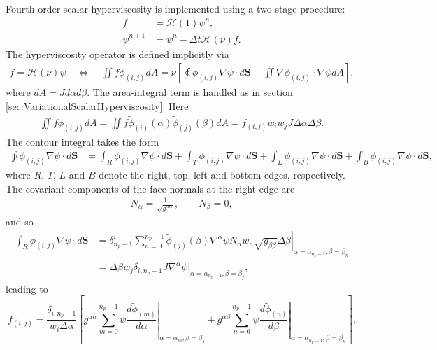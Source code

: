 \documentclass{article}
\newcommand{\vb}{\mathbf}
\newcommand{\diff}[2]{\frac{d #1}{d #2}}
\begin{document}
Fourth-order scalar hyperviscosity is implemented using a two stage procedure:
\begin{align}
f &= \mathcal{H}(1) \psi^n, \\
\psi^{n+1} &= \psi^n - \Delta t \mathcal{H}(\nu) f.
\end{align}  The hyperviscosity operator is defined implicitly via
\begin{align}
f = \mathcal{H}(\nu) \psi \quad \Longleftrightarrow \quad \iint f \phi_{(i,j)} dA = \nu \left[ \oint \phi_{(i,j)} \nabla \psi \cdot d\vb{S} - \iint \nabla \phi_{(i,j)} \cdot \nabla \psi dA \right],
\end{align} where $dA = J d\alpha d\beta$.  The area-integral term is handled as in section \ref{sec:VariationalScalarHyperviscosity}.  Here
\begin{align}
\iint f \phi_{(i,j)} dA = \iint f \tilde{\phi}_{(i)}(\alpha) \tilde{\phi}_{(j)}(\beta) dA = f_{(i,j)} w_i w_j J \Delta \alpha \Delta \beta.
\end{align}  The contour integral takes the form
\begin{align}
\oint \phi_{(i,j)} \nabla \psi \cdot d\vb{S} &= \int_R \phi_{(i,j)} \nabla \psi \cdot d\vb{S} + \int_T \phi_{(i,j)} \nabla \psi \cdot d\vb{S} + \int_L \phi_{(i,j)} \nabla \psi \cdot d\vb{S} + \int_B \phi_{(i,j)} \nabla \psi \cdot d\vb{S},
\end{align} where $R$, $T$, $L$ and $B$ denote the right, top, left and bottom edges, respectively.  The covariant components of the face normals at the right edge are
\begin{align}
N_\alpha = \frac{1}{\sqrt{g^{\alpha \alpha}}}, \qquad N_\beta = 0,
\end{align} and so
\begin{align}
\int_R \phi_{(i,j)} \nabla \psi \cdot d\vb{S} &= \delta^i_{n_p-1} \sum_{n=0}^{n_p-1} \left. \tilde{\phi}_{(j)}(\beta) \nabla^\alpha \psi N_\alpha w_n \sqrt{g_{\beta \beta}} \Delta \beta \right\vert_{\alpha = \alpha_{n_p-1}, \beta = \beta_n} \\
&= \Delta \beta w_j \delta_{i,n_p-1} \left. J \nabla^\alpha \psi \right\vert_{\alpha = \alpha_{n_p-1}, \beta = \beta_j},
\end{align} leading to
\begin{equation}
f_{(i,j)} = \frac{\delta_{i,n_p-1}}{w_i \Delta \alpha} \left[ g^{\alpha \alpha} \sum_{m=0}^{n_p-1} \psi \left. \diff{\tilde{\phi}_{(m)}}{\alpha} \right\vert_{\alpha = \alpha_m, \beta = \beta_j} + g^{\alpha \beta} \sum_{n=0}^{n_p-1} \psi \left. \diff{\tilde{\phi}_{(n)}}{\beta} \right\vert_{\alpha = \alpha_{n_p-1}, \beta = \beta_n} \right].
\end{equation}
\end{document}
